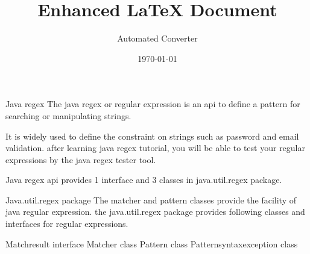 \documentclass{article}
\title{Enhanced LaTeX Document}
\author{Automated Converter}
\date{\today}
\begin{document}
\maketitle

\onehalfspacing

Java regex
The java regex or regular expression is an api to define a pattern for searching or manipulating strings.


It is widely used to define the constraint on strings such as password and email validation. after learning java regex tutorial, you will be able to test your regular expressions by the java regex tester tool.


Java regex api provides 1 interface and 3 classes in java.util.regex package.


Java.util.regex package
The matcher and pattern classes provide the facility of java regular expression. the java.util.regex package provides following classes and interfaces for regular expressions.


Matchresult interface
Matcher class
Pattern class
Patternsyntaxexception class
\end{document}
